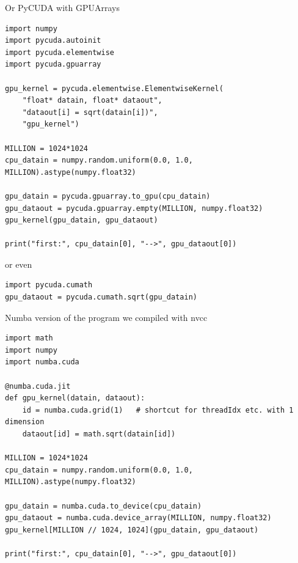 \documentclass[aspectratio=169]{beamer}
\begin{document}
\begin{frame}[fragile]{Or PyCUDA with GPUArrays}
\vspace{0.2 cm}
\scriptsize
\begin{verbatim}
import numpy
import pycuda.autoinit
import pycuda.elementwise
import pycuda.gpuarray

gpu_kernel = pycuda.elementwise.ElementwiseKernel(
    "float* datain, float* dataout",
    "dataout[i] = sqrt(datain[i])",
    "gpu_kernel")

MILLION = 1024*1024
cpu_datain = numpy.random.uniform(0.0, 1.0, MILLION).astype(numpy.float32)

gpu_datain = pycuda.gpuarray.to_gpu(cpu_datain)
gpu_dataout = pycuda.gpuarray.empty(MILLION, numpy.float32)
gpu_kernel(gpu_datain, gpu_dataout)

print("first:", cpu_datain[0], "-->", gpu_dataout[0])
\end{verbatim}

\vspace{0.15 cm}
\normalsize
or even

\vspace{0.15 cm}
\scriptsize
\begin{verbatim}
import pycuda.cumath
gpu_dataout = pycuda.cumath.sqrt(gpu_datain)
\end{verbatim}
\end{frame}

\begin{frame}[fragile]{Numba version of the program we compiled with nvcc}
\vspace{0.1 cm}
\scriptsize
\begin{verbatim}
import math
import numpy
import numba.cuda

@numba.cuda.jit
def gpu_kernel(datain, dataout):
    id = numba.cuda.grid(1)   # shortcut for threadIdx etc. with 1 dimension
    dataout[id] = math.sqrt(datain[id])

MILLION = 1024*1024
cpu_datain = numpy.random.uniform(0.0, 1.0, MILLION).astype(numpy.float32)

gpu_datain = numba.cuda.to_device(cpu_datain)
gpu_dataout = numba.cuda.device_array(MILLION, numpy.float32)
gpu_kernel[MILLION // 1024, 1024](gpu_datain, gpu_dataout)

print("first:", cpu_datain[0], "-->", gpu_dataout[0])
\end{verbatim}
\end{frame}
\end{document}
